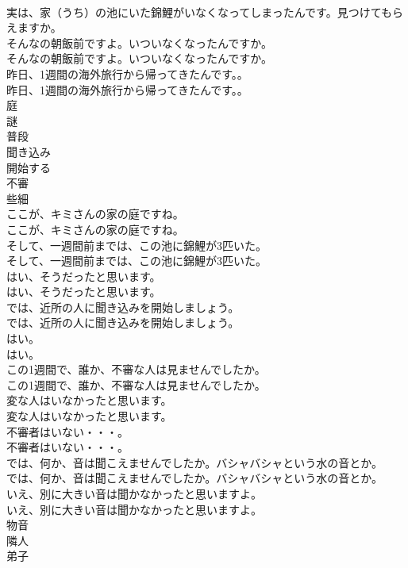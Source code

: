 \documentclass[8pt]{extreport}
\begin{document}
\begin{CJK}{UTF8}{min}
\\	実は、家（うち）の池にいた錦鯉がいなくなってしまったんです。見つけてもらえますか。 
\\	そんなの朝飯前ですよ。いついなくなったんですか。	
\\	そんなの朝飯前ですよ。いついなくなったんですか。 
\\	昨日、1週間の海外旅行から帰ってきたんです。。	
\\	昨日、1週間の海外旅行から帰ってきたんです。。 
\\	庭
\\	謎
\\	普段
\\	聞き込み
\\	開始する
\\	不審
\\	些細
\\	ここが、キミさんの家の庭ですね。	
\\	ここが、キミさんの家の庭ですね。 
\\	そして、一週間前までは、この池に錦鯉が3匹いた。	
\\	そして、一週間前までは、この池に錦鯉が3匹いた。 
\\	はい、そうだったと思います。	
\\	はい、そうだったと思います。 
\\	では、近所の人に聞き込みを開始しましょう。	
\\	では、近所の人に聞き込みを開始しましょう。 
\\	はい。	
\\	はい。 
\\	この1週間で、誰か、不審な人は見ませんでしたか。	
\\	この1週間で、誰か、不審な人は見ませんでしたか。 
\\	変な人はいなかったと思います。	
\\	変な人はいなかったと思います。 
\\	不審者はいない・・・。	
\\	不審者はいない・・・。 
\\	では、何か、音は聞こえませんでしたか。バシャバシャという水の音とか。	
\\	では、何か、音は聞こえませんでしたか。バシャバシャという水の音とか。 
\\	いえ、別に大きい音は聞かなかったと思いますよ。	
\\	いえ、別に大きい音は聞かなかったと思いますよ。 
\\	物音
\\	隣人
\\	弟子

\end{CJK}
\end{document}

